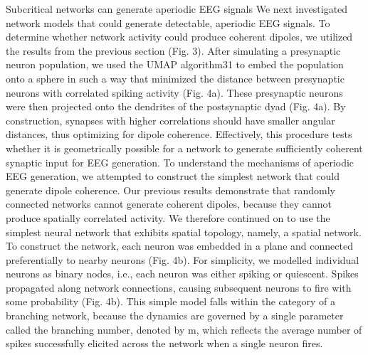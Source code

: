 Subcritical networks can generate aperiodic EEG signals
We next investigated network models that could generate detectable, aperiodic EEG signals. To determine whether network activity could produce coherent dipoles, we utilized the results from the previous section (Fig. 3). After simulating a presynaptic neuron population, we used the UMAP algorithm31 to embed the population onto a sphere in such a way that minimized the distance between presynaptic neurons with correlated spiking activity (Fig. 4a). These presynaptic neurons were then projected onto the dendrites of the postsynaptic dyad (Fig. 4a). By construction, synapses with higher correlations should have smaller angular distances, thus optimizing for dipole coherence. Effectively, this procedure tests whether it is geometrically possible for a network to generate sufficiently coherent synaptic input for EEG generation. 
To understand the mechanisms of aperiodic EEG generation, we attempted to construct the simplest network that could generate dipole coherence. Our previous results demonstrate that randomly connected networks cannot generate coherent dipoles, because they cannot produce spatially correlated activity. We therefore continued on to use the simplest neural network that exhibits spatial topology, namely, a spatial network. To construct the network, each neuron was embedded in a plane and connected preferentially to nearby neurons (Fig. 4b). For simplicity, we modelled individual neurons as binary nodes, i.e., each neuron was either spiking or quiescent. Spikes propagated along network connections, causing subsequent neurons to fire with some probability (Fig. 4b). This simple model falls within the category of a branching network, because the dynamics are governed by a single parameter called the branching number, denoted by m, which reflects the average number of spikes successfully elicited across the network when a single neuron fires. 
